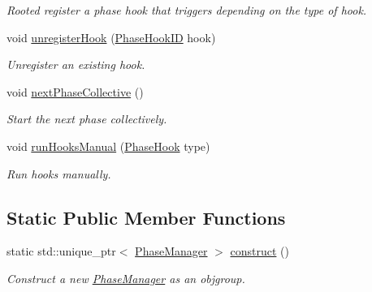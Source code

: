 \begin{DoxyCompactItemize}
\begin{DoxyCompactList}\small\item\em Rooted register a phase hook that triggers depending on the type of hook. \end{DoxyCompactList}\item 
void \hyperlink{structvt_1_1phase_1_1_phase_manager_a78334fd49c35f694f1e5fe5c560dc211}{unregister\+Hook} (\hyperlink{structvt_1_1phase_1_1_phase_hook_i_d}{Phase\+Hook\+ID} hook)
\begin{DoxyCompactList}\small\item\em Unregister an existing hook. \end{DoxyCompactList}\item 
void \hyperlink{structvt_1_1phase_1_1_phase_manager_ac94bfde4a103cbdec426542191c41092}{next\+Phase\+Collective} ()
\begin{DoxyCompactList}\small\item\em Start the next phase collectively. \end{DoxyCompactList}\item 
void \hyperlink{structvt_1_1phase_1_1_phase_manager_ae436f95e5eb570b17c71a48d96675f69}{run\+Hooks\+Manual} (\hyperlink{namespacevt_1_1phase_aec9a63fdd99680d7a7fe99d321193811}{Phase\+Hook} type)
\begin{DoxyCompactList}\small\item\em Run hooks manually. \end{DoxyCompactList}\end{DoxyCompactItemize}
\subsection*{Static Public Member Functions}
\begin{DoxyCompactItemize}
\item 
static std\+::unique\+\_\+ptr$<$ \hyperlink{structvt_1_1phase_1_1_phase_manager}{Phase\+Manager} $>$ \hyperlink{structvt_1_1phase_1_1_phase_manager_a6d864be02daa1cc0ec0b336aa1ebc31e}{construct} ()
\begin{DoxyCompactList}\small\item\em Construct a new {\ttfamily \hyperlink{structvt_1_1phase_1_1_phase_manager}{Phase\+Manager}} as an objgroup. \end{DoxyCompactList}\end{DoxyCompactItemize}
